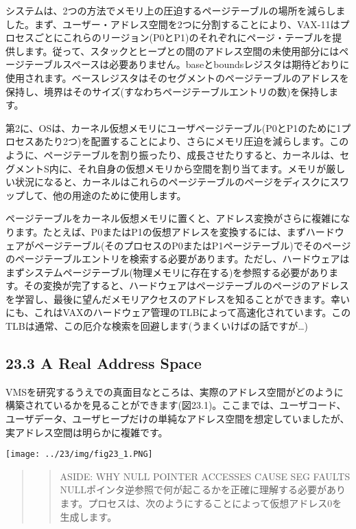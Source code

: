 システムは、2つの方法でメモリ上の圧迫するページテーブルの場所を減らしました。まず、ユーザー・アドレス空間を2つに分割することにより、VAX-11はプロセスごとにこれらのリージョン(P0とP1)のそれぞれにページ・テーブルを提供します。従って、スタックとヒープとの間のアドレス空間の未使用部分にはページテーブルスペースは必要ありません。baseとboundsレジスタは期待どおりに使用されます。ベースレジスタはそのセグメントのページテーブルのアドレスを保持し、境界はそのサイズ(すなわちページテーブルエントリの数)を保持します。

第2に、OSは、カーネル仮想メモリにユーザページテーブル(P0とP1のために1プロセスあたり2つ)を配置することにより、さらにメモリ圧迫を減らします。このように、ページテーブルを割り振ったり、成長させたりすると、カーネルは、セグメントS内に、それ自身の仮想メモリから空間を割り当てます。メモリが厳しい状況になると、カーネルはこれらのページテーブルのページをディスクにスワップして、他の用途のために使用します。

ページテーブルをカーネル仮想メモリに置くと、アドレス変換がさらに複雑になります。たとえば、P0またはP1の仮想アドレスを変換するには、まずハードウェアがページテーブル(そのプロセスのP0またはP1ページテーブル)でそのページのページテーブルエントリを検索する必要があります。ただし、ハードウェアはまずシステムページテーブル(物理メモリに存在する)を参照する必要があります。その変換が完了すると、ハードウェアはページテーブルのページのアドレスを学習し、最後に望んだメモリアクセスのアドレスを知ることができます。幸いにも、これはVAXのハードウェア管理のTLBによって高速化されています。このTLBは通常、この厄介な検索を回避します(うまくいけばの話ですが\ldots)

\hypertarget{a-real-address-space}{%
\subsection*{23.3 A Real Address Space}\label{a-real-address-space}}

VMSを研究するうえでの真面目なところは、実際のアドレス空間がどのように構築されているかを見ることができます(図23.1)。ここまでは、ユーザコード、ユーザデータ、ユーザヒープだけの単純なアドレス空間を想定していましたが、実アドレス空間は明らかに複雑です。

\texttt{[image: ../23/img/fig23\_1.PNG]}

\begin{quote}
\begin{quote}
ASIDE: WHY NULL POINTER ACCESSES CAUSE SEG FAULTS\\
NULLポインタ逆参照で何が起こるかを正確に理解する必要があります。プロセスは、次のようにすることによって仮想アドレス0を生成します。
\end{quote}
\end{quote}

